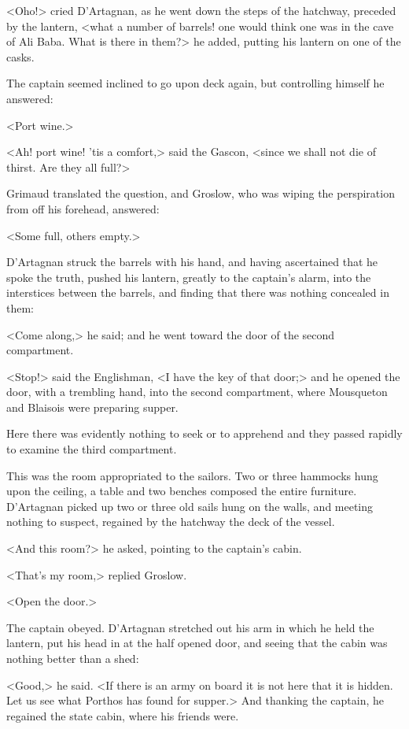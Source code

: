 <Oho!> cried D'Artagnan, as he went down the steps of the hatchway, preceded by the lantern, <what a number of barrels! one would think one was in the cave of Ali Baba. What is there in them?> he added, putting his lantern on one of the casks.

The captain seemed inclined to go upon deck again, but controlling himself he answered:

<Port wine.>

<Ah! port wine! 'tis a comfort,> said the Gascon, <since we shall not die of thirst. Are they all full?>

Grimaud translated the question, and Groslow, who was wiping the perspiration from off his forehead, answered:

<Some full, others empty.>

D'Artagnan struck the barrels with his hand, and having ascertained that he spoke the truth, pushed his lantern, greatly to the captain's alarm, into the interstices between the barrels, and finding that there was nothing concealed in them:

<Come along,> he said; and he went toward the door of the second compartment.

<Stop!> said the Englishman, <I have the key of that door;> and he opened the door, with a trembling hand, into the second compartment, where Mousqueton and Blaisois were preparing supper.

Here there was evidently nothing to seek or to apprehend and they passed rapidly to examine the third compartment.

This was the room appropriated to the sailors. Two or three hammocks hung upon the ceiling, a table and two benches composed the entire furniture. D'Artagnan picked up two or three old sails hung on the walls, and meeting nothing to suspect, regained by the hatchway the deck of the vessel.

<And this room?> he asked, pointing to the captain's cabin.

<That's my room,> replied Groslow.

<Open the door.>

The captain obeyed. D'Artagnan stretched out his arm in which he held the lantern, put his head in at the half opened door, and seeing that the cabin was nothing better than a shed:

<Good,> he said. <If there is an army on board it is not here that it is hidden. Let us see what Porthos has found for supper.> And thanking the captain, he regained the state cabin, where his friends were.

